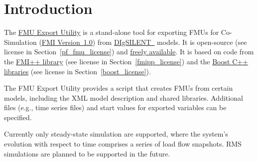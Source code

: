 \chapter{Introduction}



The \href{http://powerfactory-fmu.sourceforge.net}{\fmipp \pf FMU Export Utility} is a stand-alone tool for exporting FMUs for Co-Simulation (\href{https://www.fmi-standard.org/}{FMI Version~1.0}) from \href{http://www.digsilent.com/}{DIgSILENT~\pf} models. It is open-source (see license in Section~\ref{pf_fmu_license}) and \href{http://powerfactory-fmu.sourceforge.net}{freely available}. It is based on code from the \href{http://fmipp.sourceforge.net}{FMI++ library} (see license in Section~\ref{fmipp_license}) and the \href{http://www.boost.org/}{Boost C++ libraries} (see license in Section~\ref{boost_license}).

The \fmipp \pf FMU Export Utility provides a \href{https://www.python.org/}{\python} script that creates FMUs from certain \pf models, including the XML model description and shared libraries. Additional files (e.g., time series files) and start values for exported variables can be specified.

Currently only steady-state simulation are supported, where the system’s evolution with respect to time comprises a series of load flow snapshots.
RMS simulations are planned to be supported in the future.